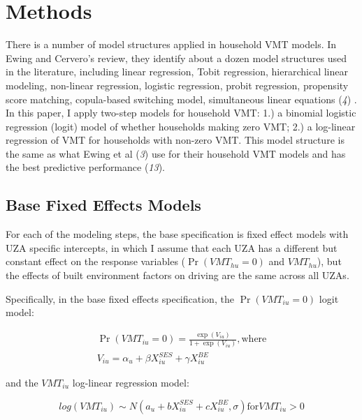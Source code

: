 \documentclass[numbered]{trbunofficial}
\begin{document}
\hypertarget{methods}{%
\section{Methods}\label{methods}}

There is a number of model structures applied in household VMT models. In Ewing and Cervero's review, they identify about a dozen model structures used in the literature, including linear regression, Tobit regression, hierarchical linear modeling, non-linear regression, logistic regression, probit regression, propensity score matching, copula-based switching model, simultaneous linear equations (\emph{4}) . In this paper, I apply two-step models for household VMT: 1.) a binomial logistic regression (logit) model of whether households making zero VMT; 2.) a log-linear regression of VMT for households with non-zero VMT. This model structure is the same as what Ewing et al (\emph{3}) use for their household VMT models and has the best predictive performance (\emph{13}).

\hypertarget{base-fixed-effects-models}{%
\subsection{Base Fixed Effects Models}\label{base-fixed-effects-models}}

For each of the modeling steps, the base specification is fixed effect models with UZA specific intercepts, in which I assume that each UZA has a different but constant effect on the response variables (\(\Pr(VMT_{hu}=0)\) and \(VMT_{hu}\)), but the effects of built environment factors on driving are the same across all UZAs.

Specifically, in the base fixed effects specification, the \(\Pr(VMT_{iu}=0)\) logit model:

\begin{equation}
\label{eq:base-step1}
\begin{split}
\Pr(VMT_{iu}=0) = \frac{\exp(V_{iu})}{1 + \exp(V_{iu})}, \text{where} \\
V_{iu} = \alpha_{u} + \beta X_{iu}^{SES} + \gamma X_{iu}^{BE}
\end{split}
\end{equation}

and the \(VMT_{iu}\) log-linear regression model:

\begin{equation}
\label{eq:base-step2}
log(VMT_{iu}) \sim N(a_{u} + b X_{iu}^{SES} + c X_{iu}^{BE}, \sigma) \text{for} VMT_{iu} > 0
\end{equation}
\end{document}
